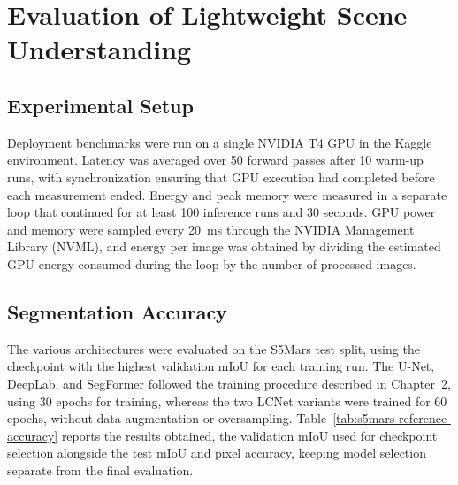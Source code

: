 \chapter{Evaluation of Lightweight Scene Understanding}

\section{Experimental Setup}
\label{sec:segmentation-experimental-setup}

Deployment benchmarks were run on a single NVIDIA T4 GPU in the Kaggle environment. Latency was averaged over 50 forward passes after 10 warm-up runs, with synchronization ensuring that GPU execution had completed before each measurement ended. Energy and peak memory were measured in a separate loop that continued for at least 100 inference runs and 30 seconds. GPU power and memory were sampled every 20~ms through the NVIDIA Management Library (NVML), and energy per image was obtained by dividing the estimated GPU energy consumed during the loop by the number of processed images.

\section{Segmentation Accuracy}
\label{sec:segmentation-accuracy}

The various architectures were evaluated on the S5Mars test split, using the checkpoint with the highest validation mIoU for each training run. The U-Net, DeepLab, and SegFormer followed the training procedure described in Chapter~2, using 30 epochs for training, whereas the two LCNet variants were trained for 60 epochs, without data augmentation or oversampling. Table~\ref{tab:s5mars-reference-accuracy} reports the results obtained, the validation mIoU used for checkpoint selection alongside the test mIoU and pixel accuracy, keeping model selection separate from the final evaluation.

